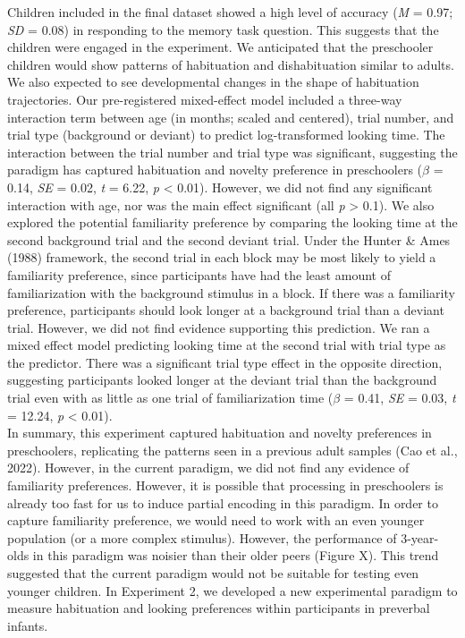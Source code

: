 \documentclass[10pt, letterpaper]{article}
\begin{document}
Children included in the final dataset showed a high level of accuracy
(\emph{M} = 0.97; \emph{SD} = 0.08) in responding to the memory task
question. This suggests that the children were engaged in the
experiment. We anticipated that the preschooler children would show
patterns of habituation and dishabituation similar to adults. We also
expected to see developmental changes in the shape of habituation
trajectories. Our pre-registered mixed-effect model included a three-way
interaction term between age (in months; scaled and centered), trial
number, and trial type (background or deviant) to predict
log-transformed looking time. The interaction between the trial number
and trial type was significant, suggesting the paradigm has captured
habituation and novelty preference in preschoolers (\(\beta\) = 0.14,
\emph{SE} = 0.02, \emph{t} = 6.22, \emph{p} \textless{} 0.01). However,
we did not find any significant interaction with age, nor was the main
effect significant (all \emph{p} \textgreater{} 0.1). We also explored
the potential familiarity preference by comparing the looking time at
the second background trial and the second deviant trial. Under the
Hunter \& Ames (1988) framework, the second trial in each block may be
most likely to yield a familiarity preference, since participants have
had the least amount of familiarization with the background stimulus in
a block. If there was a familiarity preference, participants should look
longer at a background trial than a deviant trial. However, we did not
find evidence supporting this prediction. We ran a mixed effect model
predicting looking time at the second trial with trial type as the
predictor. There was a significant trial type effect in the opposite
direction, suggesting participants looked longer at the deviant trial
than the background trial even with as little as one trial of
familiarization time (\(\beta\) = 0.41, \emph{SE} = 0.03, \emph{t} =
12.24, \emph{p} \textless{} 0.01).\\
In summary, this experiment captured habituation and novelty preferences
in preschoolers, replicating the patterns seen in a previous adult
samples (Cao et al., 2022). However, in the current paradigm, we did not
find any evidence of familiarity preferences. However, it is possible
that processing in preschoolers is already too fast for us to induce
partial encoding in this paradigm. In order to capture familiarity
preference, we would need to work with an even younger population (or a
more complex stimulus). However, the performance of 3-year-olds in this
paradigm was noisier than their older peers (Figure X). This trend
suggested that the current paradigm would not be suitable for testing
even younger children. In Experiment 2, we developed a new experimental
paradigm to measure habituation and looking preferences within
participants in preverbal infants.
\end{document}
